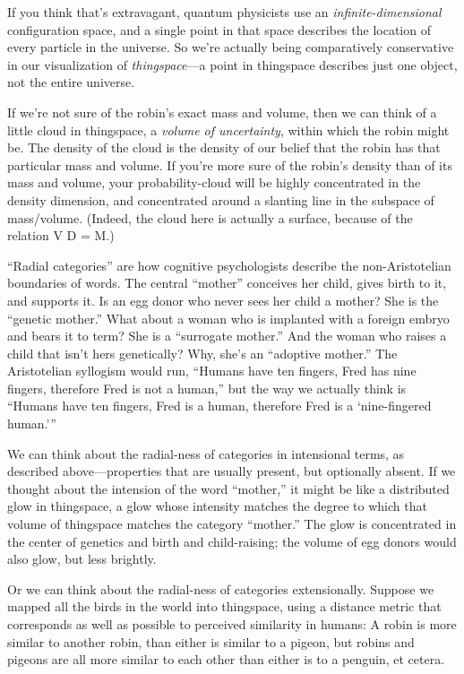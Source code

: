 {
 If you think that's extravagant, quantum
physicists use an \textit{infinite-dimensional} configuration space,
and a single point in that space describes the location of every
particle in the universe. So we're actually being
comparatively conservative in our visualization of
\textit{thingspace}{}---a point in thingspace describes just one
object, not the entire universe.}

{
 If we're not sure of the robin's
exact mass and volume, then we can think of a little cloud in
thingspace, a \textit{volume of uncertainty}, within which the robin
might be. The density of the cloud is the density of our belief that
the robin has that particular mass and volume. If
you're more sure of the robin's density
than of its mass and volume, your probability-cloud will be highly
concentrated in the density dimension, and concentrated around a
slanting line in the subspace of mass/volume. (Indeed, the cloud here
is actually a surface, because of the relation V D = M.)}

{
 ``Radial categories'' are how
cognitive psychologists describe the non-Aristotelian boundaries of
words. The central ``mother''
conceives her child, gives birth to it, and supports it. Is an egg
donor who never sees her child a mother? She is the
``genetic mother.'' What about a
woman who is implanted with a foreign embryo and bears it to term? She
is a ``surrogate mother.'' And the
woman who raises a child that isn't hers genetically?
Why, she's an ``adoptive
mother.'' The Aristotelian syllogism would run,
``Humans have ten fingers, Fred has nine fingers,
therefore Fred is not a human,'' but the way we
actually think is ``Humans have ten fingers, Fred is a
human, therefore Fred is a `nine-fingered
human.'''}

{
 We can think about the radial-ness of categories in intensional
terms, as described above---properties that are usually present, but
optionally absent. If we thought about the intension of the word
``mother,'' it might be like a
distributed glow in thingspace, a glow whose intensity matches the
degree to which that volume of thingspace matches the category
``mother.'' The glow is concentrated
in the center of genetics and birth and child-raising; the volume of
egg donors would also glow, but less brightly.}

{
 Or we can think about the radial-ness of categories extensionally.
Suppose we mapped all the birds in the world into thingspace, using a
distance metric that corresponds as well as possible to perceived
similarity in humans: A robin is more similar to another robin, than
either is similar to a pigeon, but robins and pigeons are all more
similar to each other than either is to a penguin, et cetera.}

